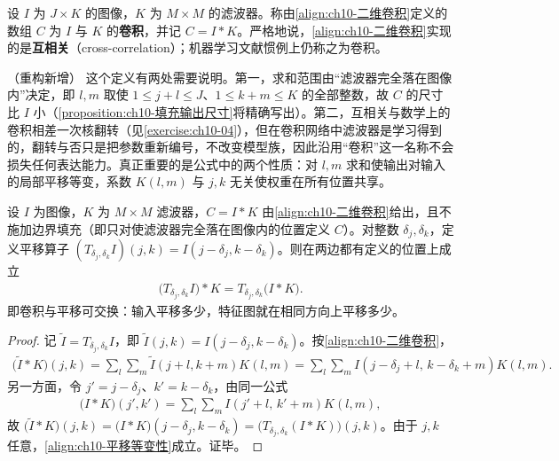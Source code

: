 \documentclass[../../main.tex]{subfiles}
\begin{document}
\begin{definition}[卷积（互相关）]\label{definition:ch10-卷积}
设 $I$ 为 $J\times K$ 的图像，$K$ 为 $M\times M$ 的滤波器。称由\eqref{align:ch10-二维卷积}定义的数组 $C$ 为 $I$ 与 $K$ 的\textbf{卷积}，并记 $C=I*K$。严格地说，\eqref{align:ch10-二维卷积}实现的是\textbf{互相关}（cross-correlation）；机器学习文献惯例上仍称之为卷积。
\end{definition}

\begin{remark}（重构新增）
这个定义有两处需要说明。第一，求和范围由“滤波器完全落在图像内”决定，即 $l,m$ 取使 $1\leqslant j+l\leqslant J$、$1\leqslant k+m\leqslant K$ 的全部整数，故 $C$ 的尺寸比 $I$ 小（\cref{proposition:ch10-填充输出尺寸}将精确写出）。第二，互相关与数学上的卷积相差一次核翻转（见\cref{exercise:ch10-04}），但在卷积网络中滤波器是学习得到的，翻转与否只是把参数重新编号，不改变模型族，因此沿用“卷积”这一名称不会损失任何表达能力。真正重要的是公式中的两个性质：对 $l,m$ 求和使输出对输入的局部平移等变，系数 $K(l,m)$ 与 $j,k$ 无关使权重在所有位置共享。
\end{remark}

\begin{proposition}[卷积的平移等变性]\label{proposition:ch10-平移等变性}
设 $I$ 为图像，$K$ 为 $M\times M$ 滤波器，$C=I*K$ 由\eqref{align:ch10-二维卷积}给出，且不施加边界填充（即只对使滤波器完全落在图像内的位置定义 $C$）。对整数 $\delta_j,\delta_k$，定义平移算子 $(T_{\delta_j,\delta_k}I)(j,k)=I(j-\delta_j,k-\delta_k)$。则在两边都有定义的位置上成立
\begin{align}
  \bigl(T_{\delta_j,\delta_k}I\bigr)*K = T_{\delta_j,\delta_k}\bigl(I*K\bigr).
  \label{align:ch10-平移等变性}
\end{align}
即卷积与平移可交换：输入平移多少，特征图就在相同方向上平移多少。
\end{proposition}
\begin{proof}
记 $\tilde{I}=T_{\delta_j,\delta_k}I$，即 $\tilde{I}(j,k)=I(j-\delta_j,k-\delta_k)$。按\eqref{align:ch10-二维卷积}，
\begin{align*}
  \bigl(\tilde{I}*K\bigr)(j,k)=\sum_{l}\sum_{m}\tilde{I}(j+l,k+m)K(l,m)
  =\sum_{l}\sum_{m}I(j-\delta_j+l,\,k-\delta_k+m)K(l,m).
\end{align*}
另一方面，令 $j'=j-\delta_j$、$k'=k-\delta_k$，由同一公式
\begin{align*}
  \bigl(I*K\bigr)(j',k')=\sum_{l}\sum_{m}I(j'+l,\,k'+m)K(l,m),
\end{align*}
故 $\bigl(\tilde{I}*K\bigr)(j,k)=\bigl(I*K\bigr)(j-\delta_j,k-\delta_k)=\bigl(T_{\delta_j,\delta_k}(I*K)\bigr)(j,k)$。由于 $j,k$ 任意，\eqref{align:ch10-平移等变性}成立。证毕。
\end{proof}
\end{document}
